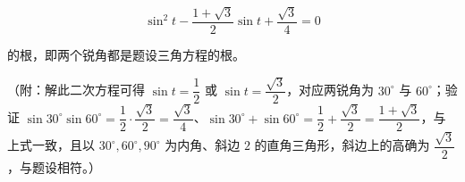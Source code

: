 \begin{answer}
\nopagebreak[4]
\[
\sin^2t-\frac{1+\sqrt3}2\sin t+\frac{\sqrt3}4=0
\]

的根，即两个锐角都是题设三角方程的根。

（附：解此二次方程可得 $\sin t=\dfrac12$ 或 $\sin t=\dfrac{\sqrt3}2$，对应两锐角为 $30^\circ$ 与 $60^\circ$；验证 $\sin30^\circ\sin60^\circ=\dfrac12\cdot\dfrac{\sqrt3}2=\dfrac{\sqrt3}4$、$\sin30^\circ+\sin60^\circ=\dfrac12+\dfrac{\sqrt3}2=\dfrac{1+\sqrt3}2$，与上式一致，且以 $30^\circ,60^\circ,90^\circ$ 为内角、斜边 $2$ 的直角三角形，斜边上的高确为 $\dfrac{\sqrt3}2$，与题设相符。）


\end{answer}